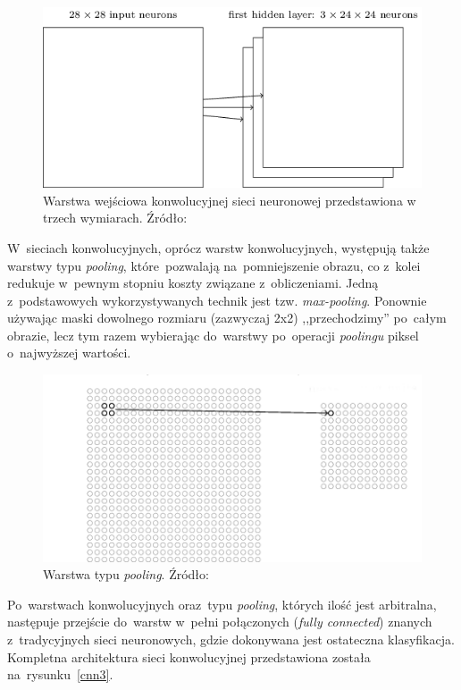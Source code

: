 \begin{figure}[ht!]
\centering
\includegraphics[scale=0.6]{res/cnn2.png}
\caption[Caption for LOF]{Warstwa wejściowa konwolucyjnej sieci neuronowej przedstawiona w trzech wymiarach. Źródło:\cite{nielsen}\label{cnn2}} 
\end{figure}
\noindent
W~sieciach konwolucyjnych, oprócz warstw konwolucyjnych, występują także warstwy typu \textit{pooling}, które~pozwalają na~pomniejszenie obrazu, co z~kolei redukuje w~pewnym stopniu koszty związane z~obliczeniami. Jedną z~podstawowych wykorzystywanych technik jest tzw. \textit{max-pooling}. Ponownie używając maski dowolnego rozmiaru (zazwyczaj 2x2) ,,przechodzimy'' po~całym obrazie, lecz tym razem wybierając do~warstwy po~operacji \textit{poolingu} piksel o~najwyższej wartości.
\begin{figure}[ht!]
\centering
\includegraphics[scale=0.6]{res/pooling.png}
\caption[Caption for LOF]{Warstwa typu \textit{pooling}. Źródło:\cite{nielsen}\label{pooling}} 
\end{figure}
\noindent
Po~warstwach konwolucyjnych oraz~typu \textit{pooling}, których ilość jest arbitralna, następuje przejście do~warstw w~pełni połączonych (\textit{fully connected}) znanych z~tradycyjnych sieci neuronowych, gdzie dokonywana jest ostateczna klasyfikacja. Kompletna architektura sieci konwolucyjnej przedstawiona została na~rysunku~\ref{cnn3}.

